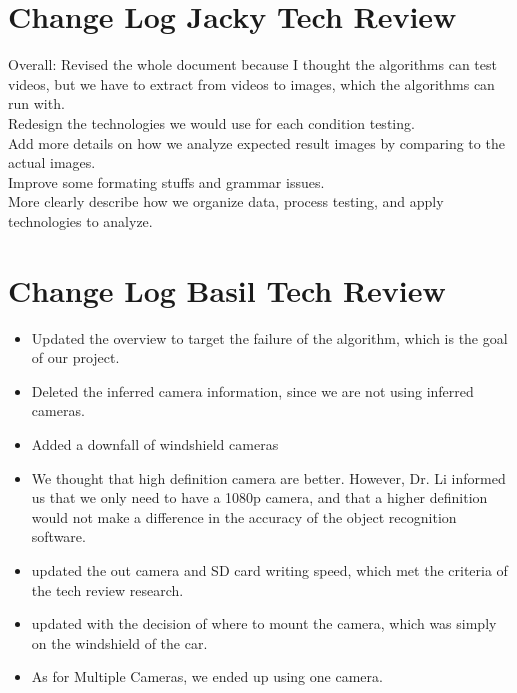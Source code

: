 \documentclass[10pt,draftclsnofoot,onecolumn,journal,compsoc]{IEEEtran}
\begin{document}
\section{Change Log Jacky Tech Review}
Overall: Revised the whole document because I thought the algorithms can test videos, but we have to extract from videos to images, which the algorithms can run with.\\
Redesign the technologies we would use for each condition testing.\\
Add more details on how we analyze expected result images by comparing to the actual images.\\
Improve some formating stuffs and grammar issues.\\
More clearly describe how we organize data, process testing, and apply technologies to analyze. 

\section{Change Log Basil Tech Review}
\begin{itemize}
	\item Updated the overview to target the failure of the algorithm, which is the goal of our project.
	\item Deleted the inferred camera information, since we are not using inferred cameras.
	\item Added a downfall of windshield cameras
	\item We thought that high definition camera are better. However, Dr. Li informed us that we only need to have a 1080p camera, and that a higher definition would not make a difference in the accuracy of the object recognition software.
	\item updated the out camera and SD card writing speed, which met the criteria of the tech review research.
	\item updated with the decision of where to mount the camera, which was simply on the windshield of the car.
	\item As for Multiple Cameras, we ended up using one camera.
\end{itemize}
\end{document}
